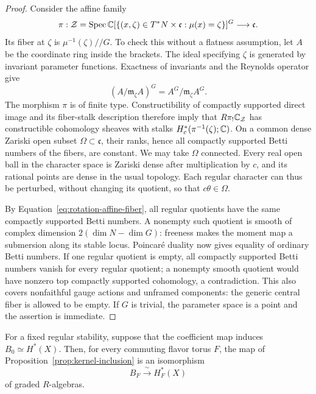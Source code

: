 \begin{proof}
Consider the affine family
\[
 \pi:\mathcal Z=
 \operatorname{Spec}\mathbb C[\{(x,\zeta)\in T^*N\times\mathfrak c:
                       \mu(x)=\zeta\}]^G
 \longrightarrow\mathfrak c.
\]
Its fiber at $\zeta$ is $\mu^{-1}(\zeta)/\!/G$.
To check this without a flatness assumption, let $A$ be the coordinate ring
inside the brackets.  The ideal specifying $\zeta$ is generated by invariant
parameter functions.  Exactness of invariants and the Reynolds operator
give
\[
 (A/\mathfrak m_\zeta A)^G
       =A^G/\mathfrak m_\zeta A^G.
\]
The morphism $\pi$ is of finite type.  Constructibility of compactly
supported direct image and its fiber-stalk description
\cite[Theorem~2.5(b)]{MaximSchurmann21}
\cite[Theorem~5.10]{SchnurerSoergel16}
therefore imply that $R\pi_!\mathbb C_{\mathcal Z}$ has constructible cohomology
sheaves with stalks $H_c^*(\pi^{-1}(\zeta);\mathbb C)$.  On a common
dense Zariski open subset $\Omega\subset\mathfrak c$, their ranks, hence all
compactly supported Betti numbers of the fibers, are constant.  We may take
$\Omega$ connected.  Every real open ball in the character space is Zariski
dense after multiplication by $c$, and its rational points are dense in the
usual topology.  Each regular character can thus be perturbed, without
changing its quotient, so that $c\theta\in\Omega$.

By Equation~\eqref{eq:rotation-affine-fiber}, all regular quotients have the same
compactly supported Betti numbers.  A nonempty such quotient is smooth of
complex dimension $2(\dim N-\dim G)$: freeness makes the moment map a
submersion along its stable locus.  Poincar\'e duality now gives equality of
ordinary Betti numbers.  If one regular quotient is empty, all compactly
supported Betti numbers vanish for every regular quotient; a nonempty smooth
quotient would have nonzero top compactly supported cohomology, a
contradiction.  This also covers nonfaithful gauge actions and unframed
components: the generic central fiber is allowed to be empty.  If $G$ is
trivial, the parameter space is a point and the assertion is immediate.
\end{proof}

\begin{lemma}\label{lem:flavor-lift}
For a fixed regular stability, suppose that the coefficient map induces
$B_0\simeq H^*(X)$.  Then, for every commuting flavor torus $F$, the map of
Proposition~\ref{prop:kernel-inclusion} is an isomorphism
\[
 B_F\xrightarrow{\ \sim\ }H_F^*(X)
\]
of graded $R$-algebras.
\end{lemma}

